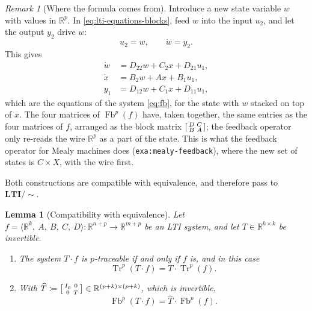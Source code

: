 \documentclass[11pt,a4paper]{article}
\theoremstyle{plain}
\newtheorem{lemma}[theorem]{Lemma}
\theoremstyle{definition}
\theoremstyle{remark}
\newtheorem{remark}[theorem]{Remark}
\DeclareMathOperator{\Fb}{Fb}
\DeclareMathOperator{\Tr}{Tr}
\newcommand{\R}{\mathbb{R}}
\newcommand{\LTIq}{\mathbf{LTI}/{\sim}}
\newcommand{\sys}[5]{\bigl\langle #1,\ #2,\ #3,\ #4,\ #5 \bigr\rangle}
\newcommand{\lbl}[1]{\nolinkurl{#1}}
\begin{document}
\begin{remark}[Where the formula comes from]
    \label{rem:fb-origin}
    Introduce a new state variable $w$ with values in $\R^p$.
    In \cref{eq:lti-equations-blocks}, feed $w$ into the input $u_2$, and let the output $y_2$ drive $w$:
    \begin{equation}
        \label{eq:fb-wiring}
        u_2 = w, \qquad \dot w = y_2 .
    \end{equation}
    This gives
    \begin{equation}
        \begin{aligned}
            \dot w & = D_{22} w + C_2 x + D_{21} u_1, \\
            \dot x & = B_2 w + A x + B_1 u_1, \\
            y_1    & = D_{12} w + C_1 x + D_{11} u_1,
        \end{aligned}
    \end{equation}
    which are the equations of the system \cref{eq:fb}, for the state with $w$ stacked on top of $x$.
    The four matrices of $\Fb^p(f)$ have, taken together, the same entries as the four matrices of $f$, arranged as the block matrix
    $\begin{bsmallmatrix} D & C \\ B & A \end{bsmallmatrix}$;
    the feedback operator only re-reads the wire $\R^p$ as a part of the state.
    This is what the feedback operator for Mealy machines does (\lbl{exa:mealy-feedback}), where the new set of states is $C \times X$, with the wire first.
\end{remark}

Both constructions are compatible with equivalence, and therefore pass to $\LTIq$.

\begin{lemma}[Compatibility with equivalence]
    \label{lem:equivalence}
    Let $f = \sys{\R^k}{A}{B}{C}{D} \colon \R^{n+p} \to \R^{m+p}$ be an LTI system, and let $T \in \R^{k \times k}$ be invertible.
    \begin{enumerate}[label=\textup{(\alph*)}]
        \item The system $T \cdot f$ is $p$-traceable if and only if $f$ is, and in this case
              \begin{equation}
                  \Tr^p(T \cdot f) = T \cdot \Tr^p(f) .
              \end{equation}
        \item With $\widehat{T} \coloneqq \begin{bsmallmatrix} I_p & 0 \\ 0 & T \end{bsmallmatrix} \in \R^{(p+k) \times (p+k)}$, which is invertible,
              \begin{equation}
                  \Fb^p(T \cdot f) = \widehat{T} \cdot \Fb^p(f) .
              \end{equation}
    \end{enumerate}
\end{lemma}
\end{document}
